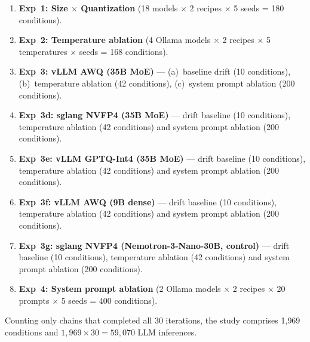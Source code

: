 \documentclass[11pt]{article}
\begin{document}
\begin{enumerate}[leftmargin=*]
  \item \textbf{Exp~1: Size $\times$ Quantization} (18 models $\times$ 2
        recipes $\times$ 5 seeds = 180 conditions).
  \item \textbf{Exp~2: Temperature ablation} (4 Ollama models $\times$ 2
        recipes $\times$ 5 temperatures $\times$ seeds = 168 conditions).
  \item \textbf{Exp~3: vLLM AWQ (35B MoE)} --- (a)~baseline drift
        (10 conditions), (b)~temperature ablation (42 conditions),
        (c)~system prompt ablation (200 conditions).
  \item \textbf{Exp~3d: sglang NVFP4 (35B MoE)} --- drift baseline
        (10 conditions), temperature ablation (42 conditions) and system
        prompt ablation (200 conditions).
  \item \textbf{Exp~3e: vLLM GPTQ-Int4 (35B MoE)} --- drift baseline
        (10 conditions), temperature ablation (42 conditions) and system
        prompt ablation (200 conditions).
  \item \textbf{Exp~3f: vLLM AWQ (9B dense)} --- drift baseline
        (10 conditions), temperature ablation (42 conditions) and system
        prompt ablation (200 conditions).
  \item \textbf{Exp~3g: sglang NVFP4 (Nemotron-3-Nano-30B, control)} ---
        drift baseline (10 conditions), temperature ablation
        (42 conditions) and system prompt ablation (200 conditions).
  \item \textbf{Exp~4: System prompt ablation} (2 Ollama models $\times$ 2
        recipes $\times$ 20 prompts $\times$ 5 seeds = 400 conditions).
\end{enumerate}

Counting only chains that completed all 30 iterations, the study comprises
1{,}969 conditions and $1{,}969 \times 30 = 59{,}070$ LLM inferences.
\end{document}
